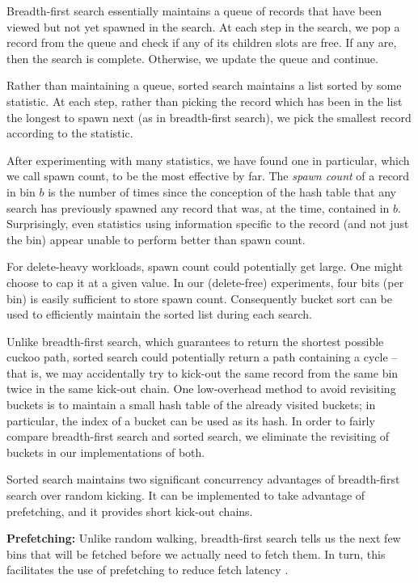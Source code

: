\documentclass{sig-alternate-05-2015}
\begin{document}
Breadth-first search essentially maintains a queue of records that
have been viewed but not yet spawned in the search. At each step in
the search, we pop a record from the queue and check if any of its
children slots are free. If any are, then the search is
complete. Otherwise, we update the queue and continue.



Rather than maintaining a queue, sorted search maintains a list sorted
by some statistic. At each step, rather than picking the record which
has been in the list the longest to spawn next (as in breadth-first
search), we pick the smallest record according to the statistic.

After experimenting with many statistics, we have found one in
particular, which we call spawn count, to be the most effective
by far. The \emph{spawn count} of a record in bin $b$ is the number of times
since the conception of the hash table that any search has previously
spawned any record that was, at the time, contained in
$b$. Surprisingly, even statistics using information specific to the
record (and not just the bin) appear unable to perform better than
spawn count.



For delete-heavy workloads, spawn count could potentially get
large. One might choose to cap it at a given value. In our
(delete-free) experiments, four bits (per bin) is easily sufficient to
store spawn count. Consequently bucket sort can be used to efficiently
maintain the sorted list during each search.



Unlike breadth-first search, which guarantees to return the shortest
possible cuckoo path, sorted search could potentially return a path
containing a cycle -- that is, we may accidentally try to kick-out the
same record from the same bin twice in the same kick-out chain. One
low-overhead method to avoid revisiting buckets is to maintain a small
hash table of the already visited buckets; in particular, the index of
a bucket can be used as its hash. In order to fairly compare
breadth-first search and sorted search, we eliminate the revisiting of
buckets in our implementations of both.

Sorted search maintains two significant concurrency advantages of
breadth-first search over random kicking. It can be implemented to
take advantage of prefetching, and it provides short kick-out
chains.



\textbf{Prefetching:} Unlike random walking, breadth-first search
tells us the next few bins that will be fetched before we actually
need to fetch them. In turn, this facilitates the use of prefetching to
reduce fetch latency \cite{li14}.
\end{document}
